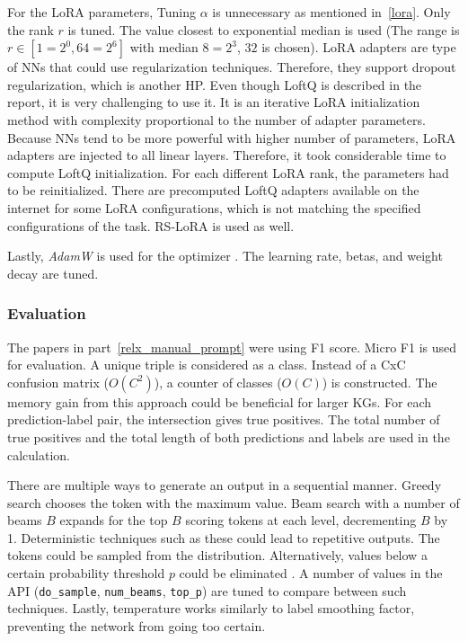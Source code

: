 \documentclass{article}
\begin{document}
For the LoRA parameters, Tuning $\alpha$ is unnecessary as mentioned in~\ref{lora}. Only the rank $r$ is tuned. The value closest to exponential median is used (The range is $r \in [1=2^0, 64=2^6]$ with median $8=2^3$, $32$ is chosen). LoRA adapters are type of NNs that could use regularization techniques. Therefore, they support dropout regularization, which is another HP. Even though LoftQ is described in the report, it is very challenging to use it. It is an iterative LoRA initialization method with complexity proportional to the number of adapter parameters. Because NNs tend to be more powerful with higher number of parameters, LoRA adapters are injected to all linear layers. Therefore, it took considerable time to compute LoftQ initialization. For each different LoRA rank, the parameters had to be reinitialized. There are precomputed LoftQ adapters available on the internet for some LoRA configurations, which is not matching the specified configurations of the task. RS-LoRA is used as well.

Lastly, \textit{AdamW} is used for the optimizer \cite{loshchilov_decoupled_2019}. The learning rate, betas, and weight decay are tuned.
\subsubsection{Evaluation}
The papers in part~\ref{relx_manual_prompt} were using F1 score. Micro F1 is used for evaluation. A unique triple is considered as a class. Instead of a CxC confusion matrix ($O(C^2)$), a counter of classes ($O(C)$) is constructed. The memory gain from this approach could be beneficial for larger KGs. For each prediction-label pair, the intersection gives true positives. The total number of true positives and the total length of both predictions and labels are used in the calculation.

There are multiple ways to generate an output in a sequential manner. Greedy search chooses the token with the maximum value. Beam search with a number of beams $B$ expands for the top $B$ scoring tokens at each level, decrementing $B$ by 1. Deterministic techniques such as these could lead to repetitive outputs. The tokens could be sampled from the distribution. Alternatively, values below a certain probability threshold $p$ could be eliminated \cite{holtzman_curious_2020}. A number of values in the API (\texttt{do\_sample}, \texttt{num\_beams}, \texttt{top\_p}) are tuned to compare between such techniques. Lastly, temperature works similarly to label smoothing factor, preventing the network from going too certain.
\end{document}

